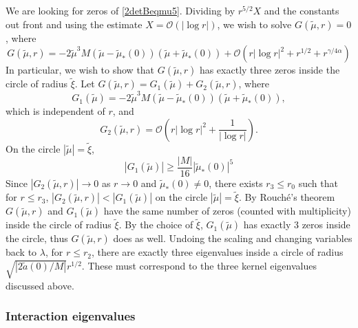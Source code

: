 \documentclass[thesis.tex]{subfiles}
\begin{document}
We are looking for zeros of \cref{2detBeqmu5}. Dividing by $r^{5/2}X$ and the constants out front and using the estimate $X = \mathcal{O}(|\log r|)$, we wish to solve $G(\tilde{\mu}, r) = 0$, where
\begin{equation}\label{2peigG}
G(\tilde{\mu}, r) = -2 \tilde{\mu}^3 M (\tilde{\mu} - \tilde{\mu}_*(0)) (\tilde{\mu} + \tilde{\mu}_*(0)) + \mathcal{O}\left( r |\log r|^2  + r^{1/2} + r^{\gamma/4 \alpha} \right)
\end{equation}
In particular, we wish to show that $G(\tilde{\mu}, r)$ has exactly three zeros inside the circle of radius $\tilde{\xi}$. Let $G(\tilde{\mu}, r) = G_1(\tilde{\mu}) + G_2(\tilde{\mu}, r)$, where 
\[
G_1(\tilde{\mu}) = -2 \tilde{\mu}^3 M (\tilde{\mu} - \tilde{\mu}_*(0)) (\tilde{\mu} + \tilde{\mu}_*(0)),
\]
which is independent of $r$, and
\[
G_2(\tilde{\mu}, r) = \mathcal{O}\left( r |\log r|^2 + \frac{1}{|\log r|} \right).
\]
On the circle $|\tilde{\mu}| = \tilde{\xi}$,
\[
|G_1(\tilde{\mu})| \geq \frac{|M|}{16}|\tilde{\mu}_*(0)|^5
\]
Since $|G_2(\tilde{\mu}, r)| \rightarrow 0$ as $r \rightarrow 0$ and $\tilde{\mu}_*(0) \neq 0$, there exists $r_3 \leq r_0$ such that for $r \leq r_3$, $|G_2(\tilde{\mu}, r)| < |G_1(\tilde{\mu})|$ on the circle $|\tilde{\mu}| = \tilde{\xi}$. By Rouch\'{e}'s theorem $G(\tilde{\mu}, r)$ and $G_1(\tilde{\mu})$ have the same number of zeros (counted with multiplicity) inside the circle of radius $\tilde{\xi}$. By the choice of $\tilde{\xi}$, $G_1(\tilde{\mu})$ has exactly 3 zeros inside the circle, thus $G(\tilde{\mu}, r)$ does as well. Undoing the scaling and changing variables back to $\lambda$, for $r \leq r_2$, there are exactly three eigenvalues inside a circle of radius $\sqrt{|2\tilde{a}(0)/M|}r^{1/2}$. These must correspond to the three kernel eigenvalues discussed above.

\subsubsection{Interaction eigenvalues}\label{sec:assyminteigs}
\end{document}
